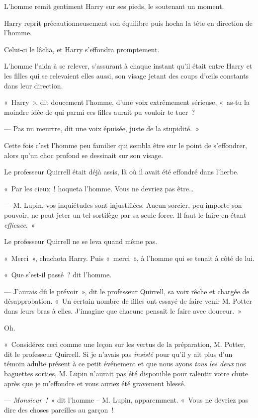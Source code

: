 L'homme remit gentiment Harry sur ses pieds, le soutenant un moment.

Harry reprit précautionneusement son équilibre puis hocha la tête en direction de l'homme.

Celui-ci le lâcha, et Harry s'effondra promptement.

L'homme l'aida à se relever, s'assurant à chaque instant qu'il était entre Harry et les filles qui se relevaient elles aussi, son visage jetant des coups d'œils constants dans leur direction.

«~Harry~», dit doucement l'homme, d'une voix extrêmement sérieuse, «~as-tu la moindre idée de qui parmi ces filles aurait pu vouloir te tuer~?

--- Pas un meurtre, dit une voix épuisée, juste de la stupidité.~»

Cette fois c'est l'homme peu familier qui sembla être sur le point de s'effondrer, alors qu'un choc profond se dessinait sur son visage.

Le professeur Quirrell était déjà assis, là où il avait été effondré dans l'herbe.

«~Par les cieux~! hoqueta l'homme.
Vous ne devriez pas être…

--- M. Lupin, vos inquiétudes sont injustifiées.
Aucun sorcier, peu importe son pouvoir, ne peut jeter un tel sortilège par sa seule force.
Il faut le faire en étant \emph{efficace}.~»

Le professeur Quirrell ne se leva quand même pas.

«~Merci~», chuchota Harry.
Puis «~merci~», à l'homme qui se tenait à côté de lui.

«~Que s'est-il passé~? dit l'homme.

--- J'aurais dû le prévoir~», dit le professeur Quirrell, sa voix rêche et chargée de désapprobation.
«~Un certain nombre de filles ont essayé de faire venir M. Potter dans leurs bras à elles.
J'imagine que chacune pensait le faire avec douceur.~»

Oh.

«~Considérez ceci comme une leçon sur les vertus de la préparation, M. Potter, dit le professeur Quirrell.
Si je n'avais pas \emph{insisté} pour qu'il y ait plus d'un témoin adulte présent à ce petit événement et que nous ayons \emph{tous les deux} nos baguettes sorties, M. Lupin n'aurait pas été disponible pour ralentir votre chute après que je m'effondre et vous auriez été gravement blessé.

--- \emph{Monsieur~!}~» dit l'homme -- M. Lupin, apparemment.
«~Vous ne devriez pas dire des choses pareilles au garçon~!

